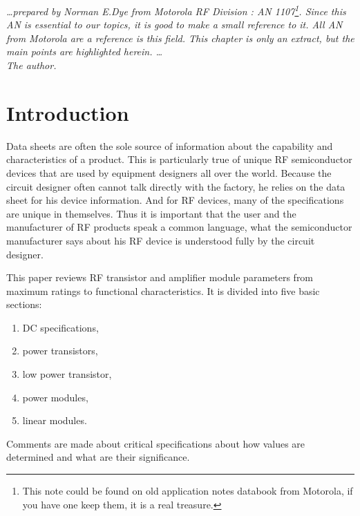 %
%
%
%

\textit{\ldots prepared by Norman E.Dye from Motorola RF Division : AN 1107\footnote{This note could be found on old application notes databook from Motorola, if you have one keep them, it is a real treasure.}. Since this AN is essential to our topics, it is good to make a small reference to it. All AN from Motorola are a reference is this field. This chapter is only an extract, but the main points are highlighted herein.  \ldots \\ The author.}

\section{Introduction}
Data sheets are often the sole source of information about the
capability and characteristics of a product. This is particularly true
of unique RF semiconductor devices that are used by equipment
designers all over the world. Because the circuit designer often
cannot talk directly with the factory, he relies on the data sheet for
his device information. And for RF devices, many of the specifications
are unique in themselves. Thus it is important that the user and the
manufacturer of RF products speak a common language, what the
semiconductor manufacturer says about his RF device is understood
fully by the circuit designer.

\bigskip 

This paper reviews RF transistor and amplifier module parameters from
maximum ratings to functional characteristics.  It is divided into
five basic sections:

\begin{enumerate}
\item DC specifications,
\item power transistors,
\item low power transistor,
\item power modules,
\item linear modules.
\end{enumerate} 

Comments are made about critical specifications about how values are
determined and what are their significance.

